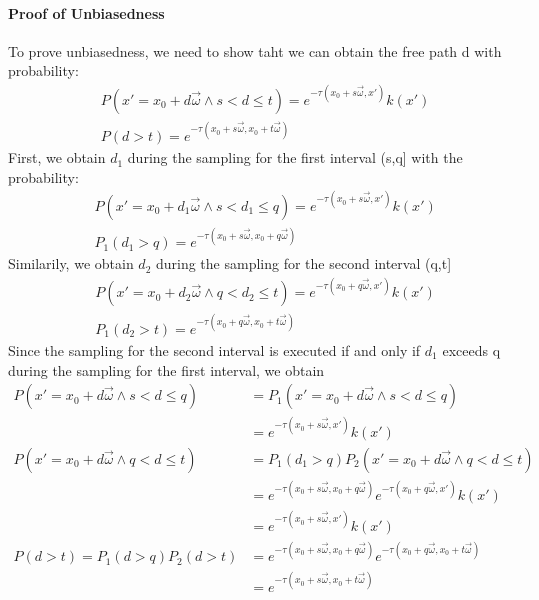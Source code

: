 \documentclass[acmtog]{acmart}
\begin{document}
\paragraph{\textbf{Proof of Unbiasedness}}
To prove unbiasedness, we need to show taht we can obtain the free path d with probability:
\begin{equation}
	\begin{aligned}
		&P(x'=x_0 + d\vec{\omega}\land s<d\leq t) = e^{-\tau(x_0+s\vec{\omega},x')}k(x')\\
		&P(d>t)= e^{-\tau(x_0+s\vec{\omega},x_0+t\vec{\omega})}
	\end{aligned}
\end{equation}
First, we obtain $d_1$ during the sampling for the first interval (s,q] with the probability:
\begin{equation}
	\begin{aligned}
		&P(x'=x_0 + d_1\vec{\omega}\land s<d_1\leq q) = e^{-\tau(x_0+s\vec{\omega},x')}k(x')\\
		&P_1(d_1>q)= e^{-\tau(x_0+s\vec{\omega},x_0+q\vec{\omega})}
	\end{aligned}
\end{equation}
Similarily, we obtain $d_2$ during the sampling for the second interval (q,t]
\begin{equation}
	\begin{aligned}
		&P(x'=x_0 + d_2\vec{\omega}\land q<d_2\leq t) = e^{-\tau(x_0+q\vec{\omega},x')}k(x')\\
		&P_1(d_2>t)= e^{-\tau(x_0+q\vec{\omega},x_0+t\vec{\omega})}
	\end{aligned}
\end{equation}
Since the sampling for the second interval is executed if and only if $d_1$ exceeds q during the sampling for the first interval, we obtain
\begin{equation}
	\begin{aligned}
		P(x'=x_0 + d\vec{\omega}\land s<d\leq q)
		&=P_1(x'=x_0 + d\vec{\omega}\land s<d\leq q)\\
		&= e^{-\tau(x_0+s\vec{\omega},x')}k(x')\\
		P(x'=x_0 + d\vec{\omega}\land q<d\leq t)
		&=P_1(d_1>q)P_2(x'=x_0 + d\vec{\omega}\land q<d\leq t)\\
		&=e^{-\tau(x_0+s\vec{\omega},x_0+q\vec{\omega})}e^{-\tau(x_0+q\vec{\omega},x')}k(x')\\
		&=e^{-\tau(x_0+s\vec{\omega},x')}k(x')\\
		P(d>t) = P_1(d>q)P_2(d>t)
		&=e^{-\tau(x_0+s\vec{\omega},x_0+q\vec{\omega})}e^{-\tau(x_0+q\vec{\omega},x_0+t\vec{\omega})}\\
		&=e^{-\tau(x_0+s\vec{\omega},x_0+t\vec{\omega})}
	\end{aligned}
\end{equation}
\end{document}
